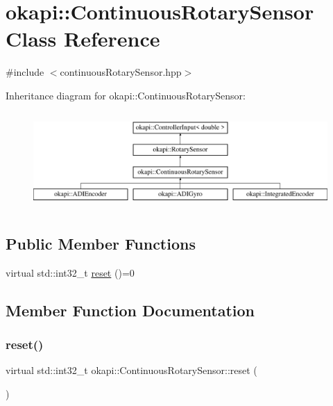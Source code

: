 \hypertarget{classokapi_1_1ContinuousRotarySensor}{}\section{okapi\+::Continuous\+Rotary\+Sensor Class Reference}
\label{classokapi_1_1ContinuousRotarySensor}


{\ttfamily \#include $<$continuous\+Rotary\+Sensor.\+hpp$>$}

Inheritance diagram for okapi\+::Continuous\+Rotary\+Sensor\+:\begin{figure}[H]
\begin{center}
\leavevmode
\includegraphics[height=3.714760cm]{classokapi_1_1ContinuousRotarySensor}
\end{center}
\end{figure}
\subsection*{Public Member Functions}
\begin{DoxyCompactItemize}
\item 
virtual std\+::int32\+\_\+t \mbox{\hyperlink{classokapi_1_1ContinuousRotarySensor_ae7268b0603097ac2d93a67e4fefa43e0}{reset}} ()=0
\end{DoxyCompactItemize}


\subsection{Member Function Documentation}
\mbox{\label{classokapi_1_1ContinuousRotarySensor_ae7268b0603097ac2d93a67e4fefa43e0}} 
\subsubsection{\texorpdfstring{reset()}{reset()}}
{\footnotesize\ttfamily virtual std\+::int32\+\_\+t okapi\+::\+Continuous\+Rotary\+Sensor\+::reset (\begin{DoxyParamCaption}{ }\end{DoxyParamCaption})\hspace{0.3cm}{\ttfamily [pure virtual]}}

